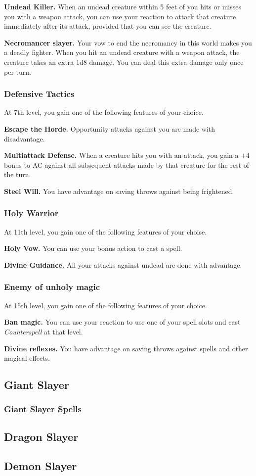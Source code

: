 \documentclass[11pt,a4paper,twocolumn]{article}
\begin{document}
	\textbf{Undead Killer.} When an undead creature within 5 feet of you hits or misses you with a weapon attack, you can use your reaction to attack that creature immediately after its attack, provided that you can see the creature.
	
	\textbf{Necromancer slayer.} Your vow to end the necromancy in this world makes you a deadly fighter. When you hit an undead creature with a weapon attack, the creature takes an extra 1d8 damage. You can deal this extra damage only once per turn.
	
	\subsubsection*{Defensive Tactics}
	At 7th level, you gain one of the following features of your choice.
	
	\textbf{Escape the Horde.} Opportunity attacks against you are made with disadvantage.
	
	\textbf{Multiattack Defense.} When a creature hits you with an attack, you gain a +4 bonus to AC against all subsequent attacks made by that creature for the rest of the turn.
	
	\textbf{Steel Will.} You have advantage on saving throws against being frightened.
	
	\subsubsection*{Holy Warrior}
	At 11th level, you gain one of the following features of your choise.
	
	\textbf{Holy Vow.} You can use your bonus action to cast a spell.
	
	\textbf{Divine Guidance.} All your attacks against undead are done with advantage.
	
	\subsubsection*{Enemy of unholy magic}
	At 15th level, you gain one of the following features of your choice.
	
	\textbf{Ban magic.} You can use your reaction to use one of your spell slots and cast \textit{Counterspell} at that level.
	
	\textbf{Divine reflexes.} You have advantage on saving throws against spells and other magical effects.
	
	\subsection*{Giant Slayer}
	\subsubsection*{Giant Slayer Spells}
	\subsection*{Dragon Slayer}
	\subsection*{Demon Slayer}
\end{document}
